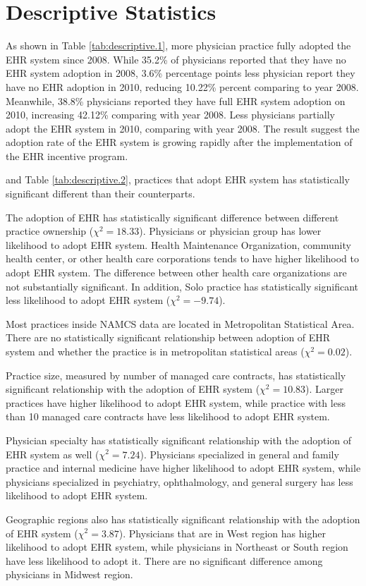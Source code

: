 \section{Descriptive Statistics}

As shown in Table \ref{tab:descriptive.1}, more physician practice fully adopted the EHR system since 2008. While 35.2\% of physicians reported that they have no EHR system adoption in 2008, 3.6\% percentage points less physician report they have no EHR adoption in 2010, reducing 10.22\% percent comparing to year 2008. Meanwhile, 38.8\% physicians reported they have full EHR system adoption on 2010, increasing 42.12\% comparing with year 2008. Less physicians partially adopt the EHR system in 2010, comparing with year 2008. The result suggest the adoption rate of the EHR system is growing rapidly after the implementation of the EHR incentive program.


and Table \ref{tab:descriptive.2}, practices that adopt EHR system has statistically significant different than their counterparts.

The adoption of EHR has statistically significant difference between different practice ownership ($\chi^2=18.33$). Physicians or physician group has lower likelihood to adopt EHR system. Health Maintenance Organization, community health center, or other health care corporations tends to have higher likelihood to adopt EHR system. The difference between other health care organizations are not substantially significant. In addition, Solo practice has statistically significant less likelihood to adopt EHR system ($\chi^2=-9.74$).

Most practices inside NAMCS data are located in Metropolitan Statistical Area. There are no statistically significant relationship between adoption of EHR system and whether the practice is in metropolitan statistical areas ($\chi^2=0.02$).

Practice size, measured by number of managed care contracts, has statistically significant relationship with the adoption of EHR system ($\chi^2=10.83$). Larger practices have higher likelihood to adopt EHR system, while practice with less than 10 managed care contracts have less likelihood to adopt EHR system.

Physician specialty has statistically significant relationship with the adoption of EHR system as well ($\chi^2=7.24$). Physicians specialized in general and family practice and internal medicine have higher likelihood to adopt EHR system, while physicians specialized in psychiatry, ophthalmology, and general surgery has less likelihood to adopt EHR system.

Geographic regions also has statistically significant relationship with the adoption of EHR system ($\chi^2=3.87$). Physicians that are in West region has higher likelihood to adopt EHR system, while physicians in Northeast or South region have less likelihood to adopt it. There are no significant difference among physicians in Midwest region.
